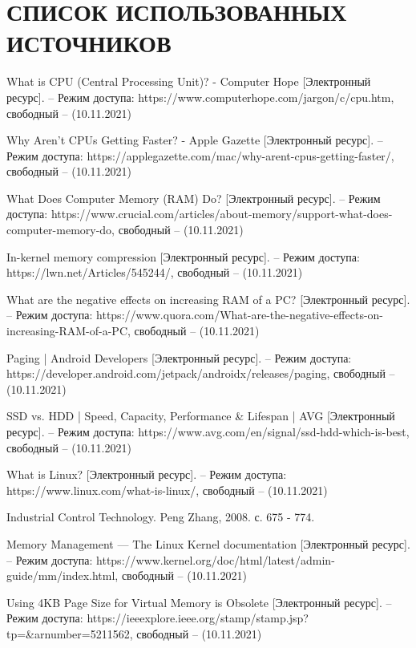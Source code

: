 \section*{СПИСОК ИСПОЛЬЗОВАННЫХ ИСТОЧНИКОВ}

\begingroup
\renewcommand{\section}[2]{}
\begin{thebibliography}{}
	What is CPU (Central Processing Unit)? - Computer Hope [Электронный ресурс]. – Режим доступа: https://www.computerhope.com/jargon/c/cpu.htm,
	свободный – (10.11.2021)
	
	Why Aren’t CPUs Getting Faster? - Apple Gazette [Электронный ресурс]. – Режим доступа: https://applegazette.com/mac/why-arent-cpus-getting-faster/,
	свободный – (10.11.2021)
	
	What Does Computer Memory (RAM) Do? [Электронный ресурс]. – Режим доступа: https://www.crucial.com/articles/about-memory/support-what-does-computer-memory-do,
	свободный – (10.11.2021)
	
	In-kernel memory compression [Электронный ресурс]. – Режим доступа: https://lwn.net/Articles/545244/, свободный – (10.11.2021)
	
	What are the negative effects on increasing RAM of a PC? [Электронный ресурс]. – Режим доступа: https://www.quora.com/What-are-the-negative-effects-on-increasing-RAM-of-a-PC, свободный – (10.11.2021)
	
	Paging | Android Developers [Электронный ресурс]. – Режим доступа: https://developer.android.com/jetpack/androidx/releases/paging, свободный – (10.11.2021)
	
	 SSD vs. HDD | Speed, Capacity, Performance \& Lifespan | AVG [Электронный ресурс]. – Режим доступа: https://www.avg.com/en/signal/ssd-hdd-which-is-best, свободный – (10.11.2021)
	 
	 What is Linux? [Электронный ресурс]. – Режим доступа: https://www.linux.com/what-is-linux/, свободный – (10.11.2021)
	
	Industrial Control Technology. Peng Zhang, 2008. с. 675 - 774.
	
	
Memory Management — The Linux Kernel documentation [Электронный ресурс]. – Режим доступа: https://www.kernel.org/doc/html/latest/admin-guide/mm/index.html, свободный – (10.11.2021)
	
	
	
Using 4KB Page Size for Virtual Memory is Obsolete [Электронный ресурс]. – Режим доступа: https://ieeexplore.ieee.org/stamp/stamp.jsp?tp=\&arnumber=5211562, свободный – (10.11.2021)
	
\end{thebibliography}
\endgroup

\pagebreak
